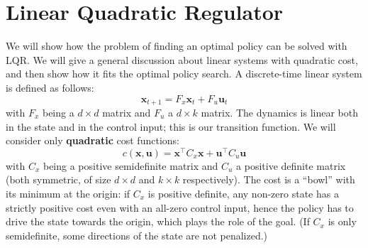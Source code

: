 \documentclass[10pt, a4paper]{report}
\begin{document}
\section{Linear Quadratic Regulator}
We will show how the problem of finding an optimal policy can be solved with LQR. We will give a general discussion about linear systems with quadratic cost, and then show how it fits the optimal policy search. A discrete-time linear system is defined as follows:\begin{equation}\label{dynamics}
    \mathbf x_{t+1}=F_x\mathbf x_t+F_u\mathbf u_t
\end{equation}
with $F_x$ being a $d\times d$ matrix and $F_u$ a $d\times k$ matrix. The dynamics is linear both in the state and in the control input; this is our transition function. We will consider only \textbf{quadratic} cost functions:\begin{equation}
    c(\mathbf x,\mathbf u)=\mathbf x^\top C_x\mathbf x+
    \mathbf u^\top C_u\mathbf u
\end{equation}
with $C_x$ being a positive semidefinite matrix and $C_u$ a positive definite matrix (both symmetric, of size $d\times d$ and $k\times k$ respectively). The cost is a ``bowl'' with its minimum at the origin: if $C_x$ is positive definite, any non-zero state has a strictly positive cost even with an all-zero control input, hence the policy has to drive the state towards the origin, which plays the role of the goal. (If $C_x$ is only semidefinite, some directions of the state are not penalized.)
\end{document}
